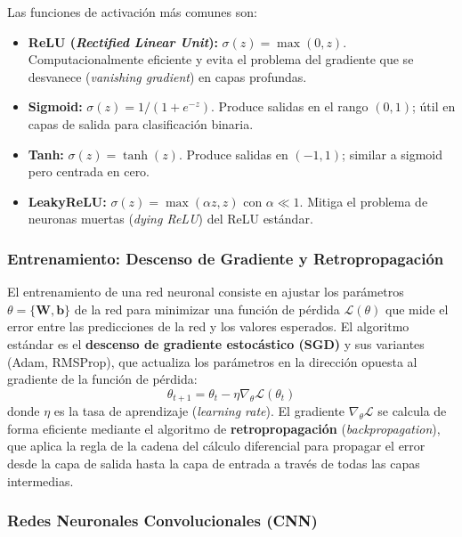Las funciones de activación más comunes son:
\begin{itemize}
    \item \textbf{ReLU (\textit{Rectified Linear Unit}):} $\sigma(z) = \max(0, z)$. Computacionalmente eficiente y evita el problema del gradiente que se desvanece (\textit{vanishing gradient}) en capas profundas.
    \item \textbf{Sigmoid:} $\sigma(z) = 1/(1 + e^{-z})$. Produce salidas en el rango $(0, 1)$; útil en capas de salida para clasificación binaria.
    \item \textbf{Tanh:} $\sigma(z) = \tanh(z)$. Produce salidas en $(-1, 1)$; similar a sigmoid pero centrada en cero.
    \item \textbf{LeakyReLU:} $\sigma(z) = \max(\alpha z, z)$ con $\alpha \ll 1$. Mitiga el problema de neuronas muertas (\textit{dying ReLU}) del ReLU estándar.
\end{itemize}

\subsubsection{Entrenamiento: Descenso de Gradiente y Retropropagación}

El entrenamiento de una red neuronal consiste en ajustar los parámetros $\theta = \{\mathbf{W}, \mathbf{b}\}$ de la red para minimizar una función de pérdida $\mathcal{L}(\theta)$ que mide el error entre las predicciones de la red y los valores esperados. El algoritmo estándar es el \textbf{descenso de gradiente estocástico (SGD)} y sus variantes (Adam, RMSProp), que actualiza los parámetros en la dirección opuesta al gradiente de la función de pérdida:
\begin{equation}
    \theta_{t+1} = \theta_t - \eta \nabla_\theta \mathcal{L}(\theta_t)
\end{equation}
donde $\eta$ es la tasa de aprendizaje (\textit{learning rate}). El gradiente $\nabla_\theta \mathcal{L}$ se calcula de forma eficiente mediante el algoritmo de \textbf{retropropagación} (\textit{backpropagation}), que aplica la regla de la cadena del cálculo diferencial para propagar el error desde la capa de salida hasta la capa de entrada a través de todas las capas intermedias.

\subsubsection{Redes Neuronales Convolucionales (CNN)}

